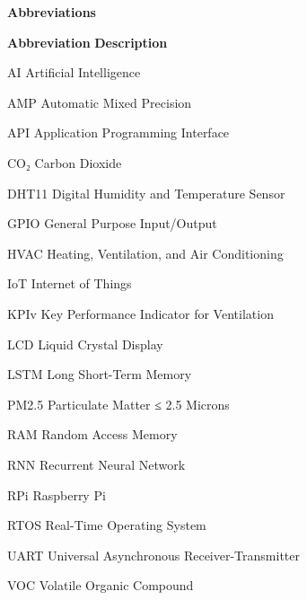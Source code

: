 
\begin{center}
\textbf{\large{Abbreviations}}
\end{center}
\vspace{1cm}
\begin{abbrv}
  \item[\textbf{Abbreviation}] \hspace{2.25cm}\textbf{Description}
  \item[AI] \hspace{2cm} Artificial Intelligence
  \item[AMP] \hspace{2cm} Automatic Mixed Precision
  \item[API] \hspace{2cm} Application Programming Interface
  \item[CO₂] \hspace{2cm} Carbon Dioxide
  \item[DHT11] \hspace{2cm} Digital Humidity and Temperature Sensor
  \item[GPIO] \hspace{2cm} General Purpose Input/Output
  \item[HVAC] \hspace{2cm} Heating, Ventilation, and Air Conditioning
  \item[IoT] \hspace{2cm} Internet of Things
  \item[KPIv] \hspace{2cm} Key Performance Indicator for Ventilation
  \item[LCD] \hspace{2cm} Liquid Crystal Display
  \item[LSTM] \hspace{2cm} Long Short-Term Memory
  \item[PM2.5] \hspace{2cm} Particulate Matter ≤ 2.5 Microns
  \item[RAM] \hspace{2cm} Random Access Memory
  \item[RNN] \hspace{2cm} Recurrent Neural Network
  \item[RPi] \hspace{2cm} Raspberry Pi
  \item[RTOS] \hspace{2cm} Real-Time Operating System
  \item[UART] \hspace{2cm} Universal Asynchronous Receiver-Transmitter
  \item[VOC] \hspace{2cm} Volatile Organic Compound
\end{abbrv}

